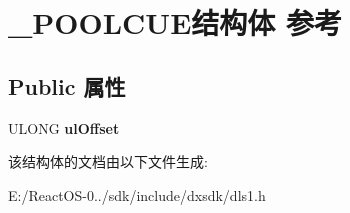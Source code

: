 \hypertarget{struct___p_o_o_l_c_u_e}{}\section{\+\_\+\+P\+O\+O\+L\+C\+U\+E结构体 参考}
\label{struct___p_o_o_l_c_u_e}
\subsection*{Public 属性}
\begin{DoxyCompactItemize}
\item 
\mbox{\label{struct___p_o_o_l_c_u_e_a36dfecd9919c56fc4282068da0ff5981}} 
U\+L\+O\+NG {\bfseries ul\+Offset}
\end{DoxyCompactItemize}


该结构体的文档由以下文件生成\+:\begin{DoxyCompactItemize}
\item 
E\+:/\+React\+O\+S-\/0../sdk/include/dxsdk/dls1.\+h\end{DoxyCompactItemize}
